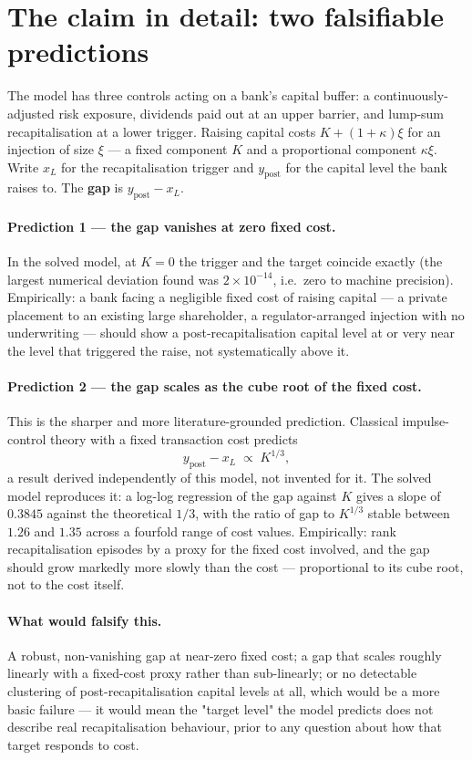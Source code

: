 \documentclass[11pt]{article}
\begin{document}
\section{The claim in detail: two falsifiable predictions}

The model has three controls acting on a bank's capital buffer: a
continuously-adjusted risk exposure, dividends paid out at an upper
barrier, and lump-sum recapitalisation at a lower trigger. Raising capital
costs $K + (1+\kappa)\xi$ for an injection of size $\xi$ --- a fixed
component $K$ and a proportional component $\kappa\xi$. Write $x_L$ for
the recapitalisation trigger and $y_{\mathrm{post}}$ for the capital
level the bank raises to. The \textbf{gap} is
$y_{\mathrm{post}} - x_L$.

\paragraph{Prediction 1 --- the gap vanishes at zero fixed cost.}
In the solved model, at $K=0$ the trigger and the target coincide exactly
(the largest numerical deviation found was $2\times 10^{-14}$, i.e.\ zero
to machine precision). Empirically: a bank facing a negligible fixed cost
of raising capital --- a private placement to an existing large
shareholder, a regulator-arranged injection with no underwriting --- should
show a post-recapitalisation capital level at or very near the level that
triggered the raise, not systematically above it.

\paragraph{Prediction 2 --- the gap scales as the cube root of the fixed
cost.} This is the sharper and more literature-grounded prediction.
Classical impulse-control theory with a fixed transaction cost predicts
\[
  y_{\mathrm{post}} - x_L \;\propto\; K^{1/3},
\]
a result derived independently of this model, not invented for it. The
solved model reproduces it: a log-log regression of the gap against $K$
gives a slope of $0.3845$ against the theoretical $1/3$, with the ratio
of gap to $K^{1/3}$ stable between $1.26$ and $1.35$ across a fourfold
range of cost values. Empirically: rank recapitalisation episodes by a
proxy for the fixed cost involved, and the gap should grow markedly more
slowly than the cost --- proportional to its cube root, not to the cost
itself.

\paragraph{What would falsify this.} A robust, non-vanishing gap at
near-zero fixed cost; a gap that scales roughly linearly with a
fixed-cost proxy rather than sub-linearly; or no detectable clustering of
post-recapitalisation capital levels at all, which would be a more basic
failure --- it would mean the "target level" the model predicts does not
describe real recapitalisation behaviour, prior to any question about how
that target responds to cost.
\end{document}
